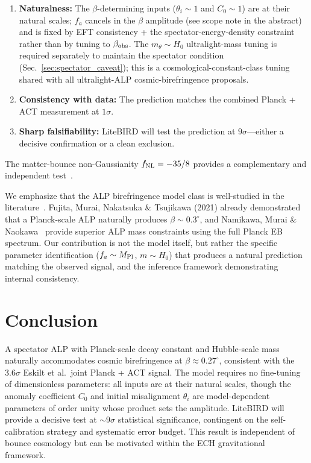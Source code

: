 \documentclass[a4paper,11pt]{article}
\begin{document}
\begin{enumerate}
\item \textbf{Naturalness:} The $\beta$-determining inputs ($\theta_i \sim 1$ and $C_0 \sim 1$) are at their natural scales; $f_a$ cancels in the $\beta$ amplitude (see scope note in the abstract) and is fixed by EFT consistency + the spectator-energy-density constraint rather than by tuning to $\beta_{\rm obs}$. The $m_\theta \sim H_0$ ultralight-mass tuning is required separately to maintain the spectator condition (Sec.~\ref{sec:spectator_caveat}); this is a cosmological-constant-class tuning shared with all ultralight-ALP cosmic-birefringence proposals.
\item \textbf{Consistency with data:} The prediction matches the combined Planck + ACT measurement at $1\sigma$.
\item \textbf{Sharp falsifiability:} LiteBIRD will test the prediction at $9\sigma$---either a decisive confirmation or a clean exclusion.
\end{enumerate}

The matter-bounce non-Gaussianity $f_{\rm NL} = -35/8$ provides a complementary and independent test~\citep{Golden2026P2}.

We emphasize that the ALP birefringence model class is well-studied in the literature~\citep{Fujita2021}. Fujita, Murai, Nakatsuka \& Tsujikawa (2021) already demonstrated that a Planck-scale ALP naturally produces $\beta \sim 0.3^\circ$, and Namikawa, Murai \& Naokawa~\citep{Namikawa2025} provide superior ALP mass constraints using the full Planck EB spectrum. Our contribution is not the model itself, but rather the specific parameter identification ($f_a \sim M_{\rm Pl}$, $m \sim H_0$) that produces a natural prediction matching the observed signal, and the inference framework demonstrating internal consistency.

\section{Conclusion}

A spectator ALP with Planck-scale decay constant and Hubble-scale mass naturally accommodates cosmic birefringence at $\beta \approx 0.27^\circ$, consistent with the $3.6\sigma$ Eskilt et al.\ joint Planck + ACT signal. The model requires no fine-tuning of dimensionless parameters: all inputs are at their natural scales, though the anomaly coefficient $C_0$ and initial misalignment $\theta_i$ are model-dependent parameters of order unity whose product sets the amplitude. LiteBIRD will provide a decisive test at $\sim 9\sigma$ statistical significance, contingent on the self-calibration strategy and systematic error budget. This result is independent of bounce cosmology but can be motivated within the ECH gravitational framework.
\end{document}
